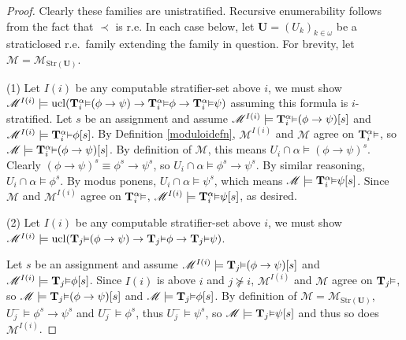 \documentclass[reqno]{article}
\theoremstyle{definition}
\def\M{\mathscr{M}}
\def\T{\mathbf{T}}
\def\U{\mathbf{U}}
\renewcommand{\Pr}[1]{\T_{#1}\mbox{\small${\vDash}$}}
\newcommand{\Prr}[2]{\T^{#1}_{#2}\mbox{\small${\vDash}$}}
\newcommand{\ucl}[1]{\mathrm{ucl}(#1)}
\newcommand{\str}[1]{\mathrm{Str}(#1)} \newcommand{\Str}[1]{\str{#1}}
\begin{document}
\begin{proof}
Clearly these families are unistratified.
Recursive enumerability follows from the fact that $\prec$ is r.e.
In each case below, let $\U=(U_k)_{k\in\omega}$ be a straticlosed r.e.~family
extending the family in question.
For brevity, let $\M=\M_{\str\U}$.

\item
(1) Let $I(i)$ be any computable stratifier-set above $i$, we must show
$\M^{I(i)}\models \ucl{\Prr\alpha i(\phi\rightarrow\psi)
\rightarrow\Prr\alpha i\phi\rightarrow\Prr\alpha i\psi}$ assuming this
formula is $i$-stratified.
Let $s$ be an assignment and assume
$\M^{I(i)}\models \Prr\alpha i(\phi\rightarrow\psi)[s]$
and $\M^{I(i)}\models\Prr\alpha i\phi[s]$.
By Definition \ref{moduloidefn}, $\M^{I(i)}$ and $\M$ agree on $\Prr\alpha i$,
so $\M\models\Prr\alpha i(\phi\rightarrow\psi)[s]$.
By definition of $\M$, this means $U_i\cap\alpha\models (\phi\rightarrow\psi)^s$.
Clearly $(\phi\rightarrow\psi)^s\equiv \phi^s\rightarrow\psi^s$,
so $U_i\cap\alpha\models \phi^s\rightarrow\psi^s$.
By similar reasoning, $U_i\cap\alpha\models\phi^s$.
By modus ponens, $U_i\cap\alpha\models\psi^s$, which means
$\M\models \Prr \alpha i \psi[s]$.
Since $\M$ and $\M^{I(i)}$ agree on $\Prr\alpha i$,
$\M^{I(i)}\models \Prr\alpha i\psi[s]$, as desired.

\item
(2) Let $I(i)$ be any computable stratifier-set above $i$, we must show
$\M^{I(i)}\models \ucl{\Pr j(\phi\rightarrow\psi)
\rightarrow\Pr j\phi\rightarrow\Pr j\psi}$.

Let $s$ be an assignment and assume
$\M^{I(i)}\models \Pr j(\phi\rightarrow\psi)[s]$
and $\M^{I(i)}\models\Pr j\phi[s]$.
Since $I(i)$ is above $i$ and $j\not\succeq i$, $\M^{I(i)}$ and $\M$
agree on $\Pr j$, so
$\M\models \Pr j(\phi\rightarrow\psi)[s]$
and $\M\models\Pr j\phi[s]$.
By definition of $\M=\M_{\str\U}$, $U^-_j\models\phi^s\rightarrow\psi^s$
and $U^-_j\models\phi^s$, thus $U^-_j\models\psi^s$, so
$\M\models \Pr j\psi[s]$ and thus so does $\M^{I(i)}$.


\end{proof}
\end{document}
